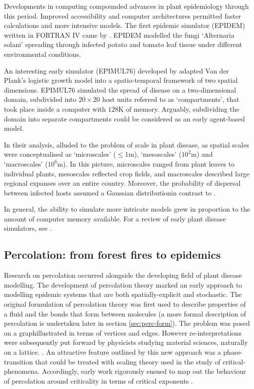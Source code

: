Developments in computing compounded advances in plant epidemiology through this period. 
Improved accessibility and computer architectures permitted faster calculations and more intensive models. 
The first epidemic simulator (EPIDEM) written in FORTRAN IV came by \cite{waggoner1969epidem}. 
EPIDEM modelled the fungi `Alternaria solani' spreading through infected potato and tomato leaf tissue under different environmental conditions. 
    
An interesting early simulator (EPIMUL76) developed by \cite{zadoks1977role} adapted Van der Plank's logistic growth model into a spatio-temporal framework of two spatial dimensions. 
EPIMUL76 simulated the spread of disease on a two-dimensional domain, subdivided into $20\times 20$ host units referred to as `compartments', that took place inside a computer with $128\mathrm{K}$ of memory.
Arguably, subdividing the domain into separate compartments could be considered as an early agent-based model. 

In their analysis, \cite{zadoks1977role} alluded to the problem of scale in plant disease, as spatial scales
were conceptualised as `microscales' ($\leq 1\mathrm{m}$), `mesoscales' ($10^2\mathrm{m}$) and `macroscales' ($10^6\mathrm{m}$).
In this picture, microscales ranged from plant leaves to individual plants, mesoscales reflected crop fields, and macroscales
described large regional expanses over an entire country. Moreover, the probability of dispersal between infected hosts assumed a
Gaussian distribution\textemdash in contrast to \cite{doi:10.1146/annurev.py.06.090168.001201}.

In general, the ability to simulate more intricate models grew in proportion to the amount of computer memory available.
For a review of early plant disease simulators, see \cite{doi:10.1146/annurev.py.23.090185.002031}.

\subsection{Percolation: from forest fires to epidemics}
\label{section:lit-rev-perc}

Research on percolation occurred alongside the developing field of plant disease modelling.
The development of percolation theory marked an early approach to modelling epidemic systems that are
both spatially-explicit and stochastic.
The original formulation of percolation theory was first used to describe properties of a fluid and the 
bonds that form between molecules \cite{perco_origin} (a more formal description of 
percolation is undertaken later in section \ref{sec:perc-form}). The problem was posed on a 
graph\textemdash illustrated in terms of vertices and edges. However re-interpretations were subsequently 
put forward by physicists studying material sciences, naturally on a lattice. \cite{Essam_1980}. 
An attractive feature outlined by this new approach was a phase-transition that could be treated with scaling theory\textemdash
used in the study of critical-phenomena. 
Accordingly, early work rigorously ensued to map out the behaviour of percolation around criticality in 
terms of critical exponents \cite{STAUFFER19791}. 

